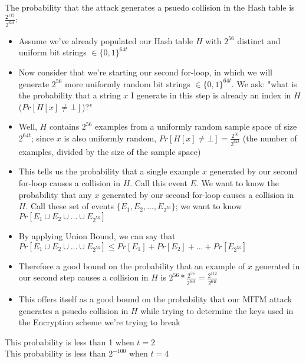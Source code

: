 \documentclass[]{article}
\begin{document}
\section{}
The probability that the attack generates a psuedo collision in the Hash table is $\frac{2^{112}}{2^{64t}}$:
\begin{itemize}
	\item Assume we've already populated our Hash table $H$ with $2^{56}$ distinct and uniform bit strings $\in \{0,1\}^{64t}$
	\item Now consider that we're starting our second for-loop, in which we will generate $2^{56}$ more uniformly random bit strings $\in \{0,1\}^{64t}$. We ask: "what is the probability that a string $x$ I generate in this step is already an index in $H$ ($Pr[H[x] \neq \bot]$)?"
	\item Well, $H$ contains $2^{56}$ examples from a uniformly random sample space of size $2^{64t}$; since $x$ is also uniformly random, $Pr[H[x] \neq \bot] = \frac{2^{56}}{2^{64t}}$ (the number of examples, divided by the size of the sample space)
	\item This tells us the probability that a single example $x$ generated by our second for-loop causes a collision in $H$. Call this event $E$. We want to know the probability that any $x$ generated by our second for-loop causes a collision in $H$. Call these set of events $\{E_1, E_2, ..., E_{2^{56}}\}$; we want to know $Pr[E_1 \cup E_2 \cup ... \cup E_{2^{56}}]$
	\item By applying Union Bound, we can say that $Pr[E_1 \cup E_2 \cup ... \cup E_{2^{56}}] \leq Pr[E_1] + Pr[E_2] + ... + Pr[E_{2^{56}}]$
	\item Therefore a good bound on the probability that an example of $x$ generated in our second step causes a collision in $H$ is $2^{56} * \frac{2^{56}}{2^{64t}} = \frac{2^{112}}{2^{64t}}$
	\item This offers itself as a good bound on the probability that our MITM attack generates a psuedo collision in $H$ while trying to determine the keys used in the Encryption scheme we're trying to break
\end{itemize}
This probability is less than 1 when $t = 2$
\\
This probability is less than $2^{-100}$ when $t = 4$
\end{document}
